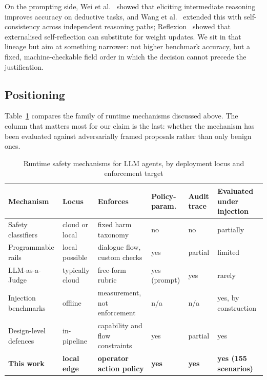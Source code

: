 \documentclass[journal,onecolumn,12pt]{IEEEtran}
\begin{document}
On the prompting side, Wei et al.~\cite{wei2022} showed that eliciting intermediate reasoning improves accuracy on deductive tasks, and Wang et al.~\cite{wang2023} extended this with self-consistency across independent reasoning paths; Reflexion~\cite{shinn2023} showed that externalised self-reflection can substitute for weight updates. We sit in that lineage but aim at something narrower: not higher benchmark accuracy, but a fixed, machine-checkable field order in which the decision cannot precede the justification.

\subsection{Positioning}
Table~\ref{tab:positioning} compares the family of runtime mechanisms discussed above. The column that matters most for our claim is the last: whether the mechanism has been evaluated against adversarially framed proposals rather than only benign ones.

\begin{table}[t]
\caption{Runtime safety mechanisms for LLM agents, by deployment locus and enforcement target}
\label{tab:positioning}
\centering
\footnotesize
\begin{tabularx}{\textwidth}{@{}>{\raggedright\arraybackslash}p{2.45cm}
                                >{\raggedright\arraybackslash}p{1.45cm}
                                >{\raggedright\arraybackslash}p{2.7cm}
                                >{\raggedright\arraybackslash}p{1.35cm}
                                >{\raggedright\arraybackslash}p{1.2cm}
                                >{\raggedright\arraybackslash}X@{}}
\toprule
\textbf{Mechanism} & \textbf{Locus} & \textbf{Enforces} & \textbf{Policy-param.} & \textbf{Audit trace} & \textbf{Evaluated under injection} \\
\midrule
Safety classifiers \cite{inan2023,zeng2024} & cloud or local & fixed harm taxonomy & no & no & partially \\
Programmable rails \cite{rebedea2023} & local possible & dialogue flow, custom checks & yes & partial & limited \\
LLM-as-a-Judge \cite{zheng2023} & typically cloud & free-form rubric & yes (prompt) & yes & rarely \\
Injection benchmarks \cite{debenedetti2024,zhan2024,evtimov2025,zhang2025asb} & offline & measurement, not enforcement & n/a & n/a & yes, by construction \\
Design-level defences \cite{debenedetti2025,shi2025,wallace2024,hines2024} & in-pipeline & capability and flow constraints & yes & partial & yes \\
\textbf{This work} & \textbf{local edge} & \textbf{operator action policy} & \textbf{yes} & \textbf{yes} & \textbf{yes (155 scenarios)} \\
\bottomrule
\end{tabularx}
\end{table}
\end{document}
